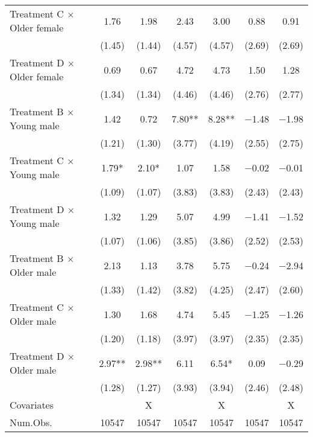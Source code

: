 \documentclass[12pt, a4paper]{article}
\begin{document}
\begin{table}[H]
\begin{threeparttable}
\begin{tabular}[t]{lcccccc}
Treatment C $\times$ Older female & \num{1.76} & \num{1.98} & \num{2.43} & \num{3.00} & \num{0.88} & \num{0.91}\\
 & (\num{1.45}) & (\num{1.44}) & (\num{4.57}) & (\num{4.57}) & (\num{2.69}) & (\num{2.69})\\
Treatment D $\times$ Older female & \num{0.69} & \num{0.67} & \num{4.72} & \num{4.73} & \num{1.50} & \num{1.28}\\
 & (\num{1.34}) & (\num{1.34}) & (\num{4.46}) & (\num{4.46}) & (\num{2.76}) & (\num{2.77})\\
Treatment B $\times$ Young male & \num{1.42} & \num{0.72} & \num{7.80}** & \num{8.28}** & \num{-1.48} & \num{-1.98}\\
 & (\num{1.21}) & (\num{1.30}) & (\num{3.77}) & (\num{4.19}) & (\num{2.55}) & (\num{2.75})\\
Treatment C $\times$ Young male & \num{1.79}* & \num{2.10}* & \num{1.07} & \num{1.58} & \num{-0.02} & \num{-0.01}\\
 & (\num{1.09}) & (\num{1.07}) & (\num{3.83}) & (\num{3.83}) & (\num{2.43}) & (\num{2.43})\\
Treatment D $\times$ Young male & \num{1.32} & \num{1.29} & \num{5.07} & \num{4.99} & \num{-1.41} & \num{-1.52}\\
 & (\num{1.07}) & (\num{1.06}) & (\num{3.85}) & (\num{3.86}) & (\num{2.52}) & (\num{2.53})\\
Treatment B $\times$ Older male & \num{2.13} & \num{1.13} & \num{3.78} & \num{5.75} & \num{-0.24} & \num{-2.94}\\
 & (\num{1.33}) & (\num{1.42}) & (\num{3.82}) & (\num{4.25}) & (\num{2.47}) & (\num{2.60})\\
Treatment C $\times$ Older male & \num{1.30} & \num{1.68} & \num{4.74} & \num{5.45} & \num{-1.25} & \num{-1.26}\\
 & (\num{1.20}) & (\num{1.18}) & (\num{3.97}) & (\num{3.97}) & (\num{2.35}) & (\num{2.35})\\
Treatment D $\times$ Older male & \num{2.97}** & \num{2.98}** & \num{6.11} & \num{6.54}* & \num{0.09} & \num{-0.29}\\
 & (\num{1.28}) & (\num{1.27}) & (\num{3.93}) & (\num{3.94}) & (\num{2.46}) & (\num{2.48})\\
\midrule
Covariates &  & X &  & X &  & X\\
Num.Obs. & \num{10547} & \num{10547} & \num{10547} & \num{10547} & \num{10547} & \num{10547}\\
\bottomrule
\end{tabular}
\begin{tablenotes}

\end{tablenotes}
\end{threeparttable}
\end{table}
\end{document}
